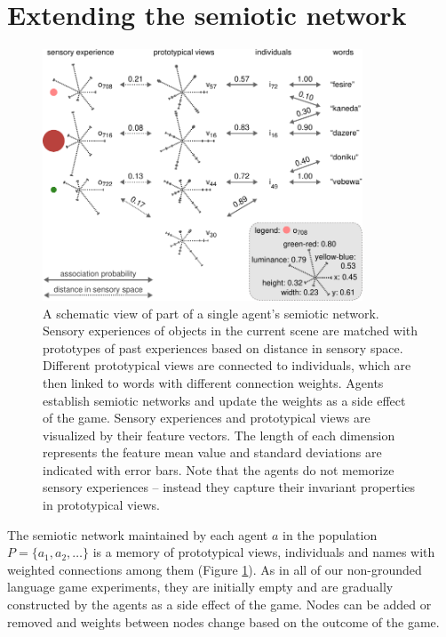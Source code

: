 \section{Extending the semiotic network}
\label{s:gng-semiotic-networks}

\begin{figure}[t]
  \centerline{\includegraphics[width=0.85\textwidth]{figures/gng-semiotic-network}}
  \caption{A schematic view of part of a single agent's semiotic
    network. Sensory experiences of objects in the current scene are
    matched with prototypes of past experiences based on distance in
    sensory space. Different prototypical views are connected to
    individuals, which are then linked to words with different
    connection weights. Agents establish semiotic networks and update
    the weights as a side effect of the game. Sensory experiences and
    prototypical views are visualized by their feature vectors. The
    length of each dimension represents the feature mean value and
    standard deviations are indicated with error bars. Note that the
    agents do not memorize sensory experiences -- instead they capture
    their invariant properties in prototypical views.}
  \label{f:gng-semiotic-network}
\end{figure}


The semiotic network maintained by each agent $a$ in the population $P
= \{a_1,a_2,\dots\}$ is a memory of prototypical views, individuals
and names with weighted connections among them (Figure
\ref{f:gng-semiotic-network}). As in all of our non-grounded language
game experiments, they are initially empty and are gradually
constructed by the agents as a side effect of the game. Nodes can be
added or removed and weights between nodes change based on the outcome
of the game.

